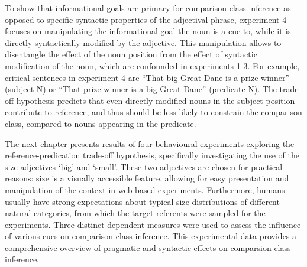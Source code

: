 To show that informational goals are primary for comparison class inference as opposed to specific syntactic properties of the adjectival phrase, experiment 4 focuses on manipulating the informational goal the noun is a cue to, while it is directly syntactically modified by the adjective. This manipulation allows to disentangle the effect of the noun position from the effect of syntactic modification of the noun, which are confounded in experiments 1-3. For example, critical sentences in experiment 4 are “That big Great Dane is a prize-winner” (subject-N) or “That prize-winner is a big Great Dane” (predicate-N). The trade-off hypothesis predicts that even directly modified nouns in the subject position contribute to reference, and thus should be less likely to constrain the comparison class, compared to nouns appearing in the predicate.

The next chapter presents results of four behavioural experiments exploring the reference-predication trade-off hypothesis, specifically investigating the use of the size adjectives ‘big’ and ‘small’. These two adjectives are chosen for practical reasons: size is a visually accessible feature, allowing for easy presentation and manipulation of the context in web-based experiments. Furthermore, humans usually have strong expectations about typical size distributions of different natural categories, from which the target referents were sampled for the experiments. Three distinct dependent measures were used to assess the influence of various cues on comparison class inference. This experimental data provides a comprehensive overview of pragmatic and syntactic effects on comparsion class inference. 